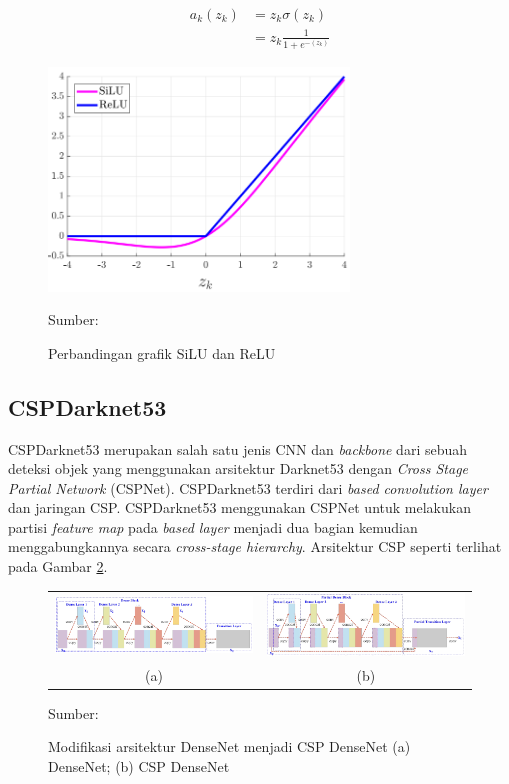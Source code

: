    \begin{align}
        \label{eq:silu}
        a_k(z_k) &= z_k\sigma (z_k)\nonumber\\
        &= z_k\frac{1}{1+e^{-(z_k)}}
    \end{align}

    \begin{figure}[H]
        \begin{center}
            \includegraphics[width=8cm]{../img/SiLU - Latex.PNG}
            \caption{Perbandingan grafik SiLU dan ReLU}
            \label{fig:silu}
            Sumber: \citep{Elfwing2018}
        \end{center}
    \end{figure}

    \subsection{CSPDarknet53}
    CSPDarknet53 merupakan salah satu jenis CNN dan \textit{backbone} dari sebuah deteksi objek yang menggunakan arsitektur Darknet53 dengan \textit{Cross Stage Partial Network} (CSPNet). CSPDarknet53 terdiri dari \textit{based convolution layer} dan jaringan CSP. CSPDarknet53 menggunakan CSPNet untuk melakukan partisi \textit{feature map} pada \textit{based layer} menjadi dua bagian kemudian menggabungkannya secara \textit{cross-stage hierarchy}. Arsitektur CSP seperti terlihat pada Gambar \ref{fig:cspnet}.

    \begin{figure}[H]
        \centering
        \begin{tabular}{cc}
            \includegraphics[width=6.5cm]{../img/DenseNet - Latex.PNG}
            &
            \includegraphics[width=6.5cm]{../img/CSP DenseNet - Latex.PNG}\\
            (a) &(b)\\
        \end{tabular}
        \caption{Modifikasi arsitektur DenseNet menjadi CSP DenseNet (a) DenseNet; (b) CSP DenseNet}
        \label{fig:cspnet}
        Sumber: \citep{Wang2020}
    \end{figure}


